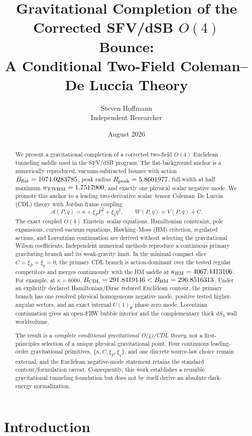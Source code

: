 \documentclass[11pt]{article}
\title{\textbf{Gravitational Completion of the Corrected SFV/dSB $O(4)$ Bounce:}\\
A Conditional Two-Field Coleman--De Luccia Theory}
\author{Steven Hoffmann\\Independent Researcher}
\date{August 2026}
\begin{document}
\maketitle

\begin{abstract}
We present a gravitational completion of a corrected two-field $O(4)$ Euclidean tunneling saddle used in the SFV/dSB program.  The flat-background anchor is a numerically reproduced, vacuum-subtracted bounce with action $B_{\rm flat}=1074.0283785$, peak radius $R_{\rm peak}=5.8601977$, full-width at half maximum $w_{\rm FWHM}=1.7517900$, and exactly one physical scalar negative mode.  We promote this anchor to a leading two-derivative scalar--tensor Coleman--De Luccia (CDL) theory with Jordan-frame coupling
\[
\mathcal A(P,q)=\kappa+\xi_P P^2+\xi_q q^2,\qquad W(P,q)=V(P,q)+C.
\]
The exact coupled $O(4)$ Einstein--scalar equations, Hamiltonian constraint, pole expansions, curved-vacuum equations, Hawking--Moss (HM) criterion, regulated actions, and Lorentzian continuation are derived without selecting the gravitational Wilson coefficients.  Independent numerical methods reproduce a continuous primary gravitating branch and its weak-gravity limit.  In the minimal compact slice $C=\xi_P=\xi_q=0$, the primary CDL branch is action-dominant over the tested regular competitors and merges continuously with the HM saddle at
$\kappa_{\rm HM}=4067.4413106$.  For example, at $\kappa=6000$,
$B_{\rm CDL}=291.8419146 < B_{\rm HM}=296.8516313$.
Under an explicitly declared Hamiltonian/Dirac reduced Euclidean contour, the primary branch has one resolved physical homogeneous negative mode, positive tested higher-angular sectors, and an exact internal $U(1)_\Phi$ phase zero mode.  Lorentzian continuation gives an open-FRW bubble interior and the complementary thick $dS_3$ wall worldvolume.

The result is a \emph{complete conditional gravitational O(4)/CDL theory}, not a first-principles selection of a unique physical gravitational point.  Four continuous leading-order gravitational primitives,
$\{\kappa,C,\xi_P,\xi_q\}$, and one discrete source-law choice remain external, and the Euclidean negative-mode statement retains the standard contour/formulation caveat.  Consequently, this work establishes a reusable gravitational tunneling foundation but does not by itself derive an absolute dark-energy normalization.
\end{abstract}

\section{Introduction}
\end{document}
